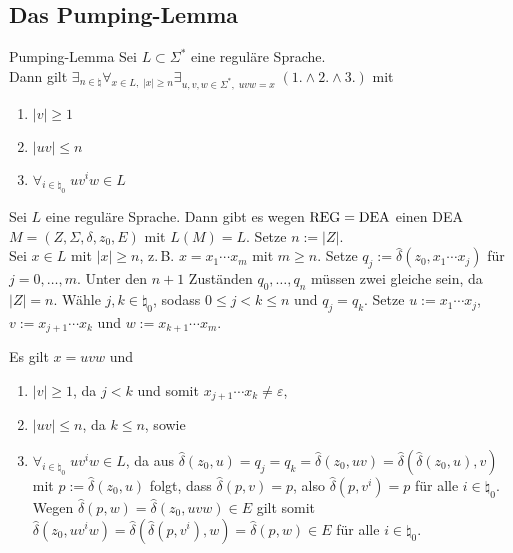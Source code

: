 \pagebreak

\subsection{%
    Das Pumping-Lemma%
}

\begin{Satz}{Pumping-Lemma}
    Sei $L \subset \Sigma^\ast$ eine reguläre Sprache.\\
    Dann gilt
    $\exists_{n \in \natural} \forall_{x \in L,\; |x| \ge n}
    \exists_{u, v, w \in \Sigma^\ast,\; uvw = x}\; (1. \land 2. \land 3.)$ mit
    \begin{enumerate}
        \item
        $|v| \ge 1$

        \item
        $|uv| \le n$

        \item
        $\forall_{i \in \natural_0}\; u v^i w \in L$
    \end{enumerate}
\end{Satz}

\begin{Beweis}
    Sei $L$ eine reguläre Sprache.
    Dann gibt es wegen $\text{REG} = \text{DEA}$ einen DEA\\
    $M = (Z, \Sigma, \delta, z_0, E)$ mit $L(M) = L$.
    Setze $n := |Z|$.\\
    Sei $x \in L$ mit $|x| \ge n$, z.\,B. $x = x_1 \dotsb x_m$ mit $m \ge n$.
    Setze $q_j := \widehat{\delta}(z_0, x_1 \dotsb x_j)$ für
    $j = 0, \dotsc, m$.
    Unter den $n + 1$ Zuständen $q_0, \dotsc, q_n$ müssen zwei gleiche sein,
    da $|Z| = n$.
    Wähle $j, k \in \natural_0$, sodass $0 \le j < k \le n$ und $q_j = q_k$.
    Setze $u := x_1 \dotsb x_j$, $v := x_{j+1} \dotsb x_k$ und
    $w := x_{k+1} \dotsb x_m$.

    Es gilt $x = uvw$ und
    \begin{enumerate}
        \item
        $|v| \ge 1$, da $j < k$ und somit
        $x_{j+1} \dotsb x_k \not= \varepsilon$,

        \item
        $|uv| \le n$, da $k \le n$, sowie

        \item
        $\forall_{i \in \natural_0}\; u v^i w \in L$, da aus
        $\widehat{\delta}(z_0, u) = q_j = q_k = \widehat{\delta}(z_0, uv) =
        \widehat{\delta}(\widehat{\delta}(z_0, u), v)$
        mit $p := \widehat{\delta}(z_0, u)$ folgt, dass
        $\widehat{\delta}(p, v) = p$,
        also $\widehat{\delta}(p, v^i) = p$ für alle $i \in \natural_0$.
        Wegen $\widehat{\delta}(p, w) = \widehat{\delta}(z_0, uvw) \in E$
        gilt somit $\widehat{\delta}(z_0, u v^i w) =
        \widehat{\delta}(\widehat{\delta}(p, v^i), w) =
        \widehat{\delta}(p, w) \in E$ für alle $i \in \natural_0$.
    \end{enumerate}
\end{Beweis}

